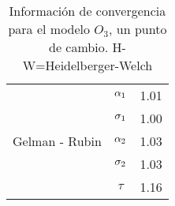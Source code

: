 \begin{table}[!h]
\begin{tabular}{|l|c|l|l|l|l|l|}
\multirow{5}{2.5cm}{Gelman - Rubin} & $\alpha_1$ & \multicolumn{5}{|c|}{1.01}\\ \cline{2-7}
&$\sigma_1$ &  \multicolumn{5}{|c|}{1.00} \\ \cline{2-7}
&$\alpha_2$ &  \multicolumn{5}{|c|}{1.03} \\ \cline{2-7}
&$\sigma_2$ &  \multicolumn{5}{|c|}{1.03} \\ \cline{2-7}
&$\tau$ &  \multicolumn{5}{|c|}{1.16} \\ \cline{1-7}



\end{tabular}
\caption{Información de convergencia para el modelo $O_3$, un punto de cambio. H-W=Heidelberger-Welch}
\label{convergencia_updc_ozono}
\end{table}




